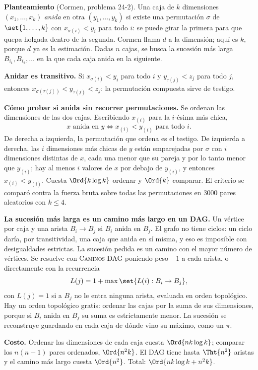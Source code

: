 \documentclass[11pt,letterpaper]{article}
\begin{document}
\textbf{Planteamiento} (Cormen, problema 24-2). Una caja de $k$
dimensiones $(x_1, \dots, x_k)$ \emph{anida} en otra
$(y_1, \dots, y_k)$ si existe una permutación $\sigma$ de
$\set{1, \dots, k}$ con $x_{\sigma(i)} < y_i$ para todo $i$: se puede
girar la primera para que quepa holgada dentro de la segunda. Cormen
llama $d$ a la dimensión; aquí es $k$, porque $d$ ya es la estimación.
Dadas $n$ cajas, se busca la sucesión más larga
$B_{i_1}, B_{i_2}, \dots$ en la que cada caja anida en la siguiente.

\textbf{Anidar es transitivo.} Si $x_{\sigma(i)} < y_i$ para todo $i$
y $y_{\tau(j)} < z_j$ para todo $j$, entonces
$x_{\sigma(\tau(j))} < y_{\tau(j)} < z_j$: la permutación compuesta
sirve de testigo.

\textbf{Cómo probar si anida sin recorrer permutaciones.} Se ordenan
las dimensiones de las dos cajas. Escribiendo $x_{(i)}$ para la
$i$-ésima más chica,
\[
  x \text{ anida en } y \iff x_{(i)} < y_{(i)}
  \text{ para todo } i .
\]
De derecha a izquierda, la permutación que ordena es el testigo. De
izquierda a derecha, las $i$ dimensiones más chicas de $y$ están
emparejadas por $\sigma$ con $i$ dimensiones distintas de $x$, cada
una menor que su pareja y por lo tanto menor que $y_{(i)}$; hay al
menos $i$ valores de $x$ por debajo de $y_{(i)}$, y entonces
$x_{(i)} < y_{(i)}$. Cuesta $\Ord{k \log k}$ ordenar y $\Ord{k}$
comparar. El criterio se comparó contra la fuerza bruta sobre todas
las permutaciones en 3000 pares aleatorios con $k \le 4$.

\textbf{La sucesión más larga es un camino más largo en un DAG.} Un
vértice por caja y una arista $B_i \to B_j$ si $B_i$ anida en $B_j$.
El grafo no tiene ciclos: un ciclo daría, por transitividad, una caja
que anida en sí misma, y eso es imposible con desigualdades
estrictas. La sucesión pedida es un camino con el mayor número de
vértices. Se resuelve con \textsc{Caminos-DAG} poniendo peso $-1$ a
cada arista, o directamente con la recurrencia
\[
  L(j) = 1 + \max \set{L(i) : B_i \to B_j} ,
\]
con $L(j) = 1$ si a $B_j$ no le entra ninguna arista, evaluada en orden
topológico. Hay un orden topológico gratis: ordenar las cajas por la
suma de sus dimensiones, porque si $B_i$ anida en $B_j$ su suma es
estrictamente menor. La sucesión se reconstruye guardando en cada caja
de dónde vino su máximo, como un $\pi$.

\textbf{Costo.} Ordenar las dimensiones de cada caja cuesta
$\Ord{n k \log k}$; comparar los $n(n - 1)$ pares ordenados,
$\Ord{n^2 k}$. El DAG tiene hasta $\Tht{n^2}$ aristas y el camino más
largo cuesta $\Ord{n^2}$. Total: $\Ord{n k \log k + n^2 k}$.
\end{document}
